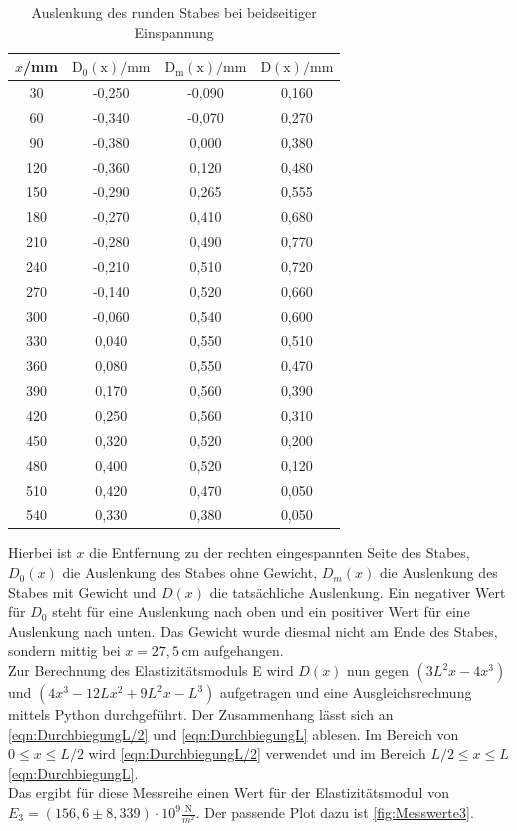   \begin{table}
    \centering
    \caption{Auslenkung des runden Stabes bei beidseitiger Einspannung}
    \label{tab:beidseitig_runder_Nullauslenkung}
    \begin{tabular}{c c c c}
      \toprule
      $x$/mm & $\mathrm{D_0(x)}/\mathrm{mm}$ & $\mathrm{D_m(x)}/\mathrm{mm}$ & $\mathrm{D(x)}/\mathrm{mm}$ \\
      \midrule
      30 & -0,250 & -0,090 & 0,160 \\
      60 & -0,340 & -0,070 & 0,270 \\
      90 & -0,380 & 0,000 & 0,380 \\
      120 & -0,360 & 0,120 & 0,480\\
      150 & -0,290 & 0,265 & 0,555 \\
      180 & -0,270 & 0,410 & 0,680 \\
      210 & -0,280 & 0,490 & 0,770 \\
      240 & -0,210 & 0,510 & 0,720 \\
      270 & -0,140 & 0,520 & 0,660 \\
      300 & -0,060 & 0,540 & 0,600\\
      330 & 0,040 & 0,550 & 0,510\\
      360 & 0,080 & 0,550 & 0,470\\
      390 & 0,170 & 0,560 & 0,390\\
      420 & 0,250 & 0,560 & 0,310 \\
      450 & 0,320 & 0,520 & 0,200\\
      480 & 0,400 & 0,520 & 0,120\\
      510 & 0,420 & 0,470 & 0,050\\
      540 & 0,330 & 0,380 & 0,050\\
      \bottomrule
    \end{tabular}
  \end{table}

  Hierbei ist $x$ die Entfernung zu der rechten eingespannten Seite des Stabes, $D_0(x)$ die Auslenkung des Stabes ohne Gewicht, $D_m(x)$ die Auslenkung des Stabes mit Gewicht und
  $D(x)$ die tatsächliche Auslenkung. Ein negativer Wert für $D_0$ steht für eine Auslenkung nach oben und ein positiver Wert für eine Auslenkung nach unten. Das Gewicht wurde diesmal
  nicht am Ende des Stabes, sondern mittig bei $x=27,5 \, \mathrm{cm}$ aufgehangen.\\

  Zur Berechnung des Elastizitätsmoduls E wird $D(x)$ nun gegen $\left(3L^2x -4x^3\right)$ und $\left(4x^3 -12Lx^2 +9L^2 x - L^3\right)$ aufgetragen und eine Ausgleichsrechnung mittels Python durchgeführt. 
  Der Zusammenhang lässt sich an \autoref{eqn:DurchbiegungL/2} und \autoref{eqn:DurchbiegungL} ablesen. Im Bereich von $0 \leq x \leq L/2$ wird \autoref{eqn:DurchbiegungL/2} verwendet und im Bereich $L/2 \leq x \leq L$ 
  \autoref{eqn:DurchbiegungL}.\\
  Das ergibt für diese Messreihe einen Wert für der Elastizitätsmodul von $E_3 = (156{,}6 \pm 8{,}339) \cdot \mathrm{10^{9}} \frac{\mathrm{N}}{m^2}$. Der passende Plot dazu ist
  \autoref{fig:Messwerte3}.

